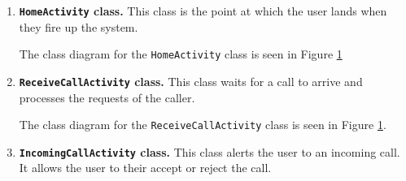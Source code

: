 \documentclass[12pt,svgnames,smaller]{article} %
\begin{document}
	\begin{enumerate}
		\begin{figure}
			\caption{Class Diagrams for \texttt{HomeActivity}, \texttt{ReceiveCallActivity}, \texttt{IncomingCallActivity}, \texttt{CallInSessionActivity} and \texttt{MakeCallActivity}}			\label{fig:SystemAnalysisandDesign-Class_Diagram_-_HomeActivity,_ReceiveCallActivity,_IncomingCallActivity,_CallInSessionActivity,_MakeCallActivity}
		\end{figure}
		
		\item \textbf{\texttt{HomeActivity} class.} This class is the point at which the user lands when they fire up the system. 
		
		The class diagram for the \texttt{HomeActivity} class is seen in Figure \ref{fig:SystemAnalysisandDesign-Class_Diagram_-_HomeActivity,_ReceiveCallActivity,_IncomingCallActivity,_CallInSessionActivity,_MakeCallActivity}
		
		\item \textbf{\texttt{ReceiveCallActivity} class.} This class waits for a call to arrive and processes the requests of the caller.
		
		The class diagram for the \texttt{ReceiveCallActivity} class is seen in Figure \ref{fig:SystemAnalysisandDesign-Class_Diagram_-_HomeActivity,_ReceiveCallActivity,_IncomingCallActivity,_CallInSessionActivity,_MakeCallActivity}.
		
		\item \textbf{\texttt{IncomingCallActivity} class.} This class alerts the user to an incoming call. It allows the user to their accept or reject the call.
		

\end{enumerate}
\end{document}
